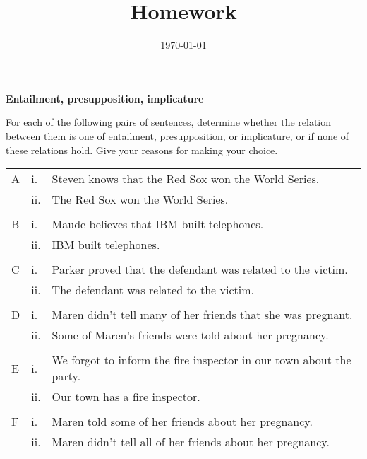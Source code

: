 \documentclass[11pt]{article}
\title{Homework \hwnumber} %
\author{\myname} %
\date{\textbf{\mycourse} \hfill {\today} \hfill \textbf{\semesteryear}} %
\begin{document}
\thispagestyle{empty} %

\clearpage %
\maketitle


\begin{problem}{1}
\textbf{Entailment, presupposition, implicature}

For each of the following pairs of sentences, determine whether the relation between them is one of entailment, presupposition, or implicature, or if none of these relations hold. Give your reasons for making your choice.

\begin{tabular}{l l l}
    A & i. & Steven knows that the Red Sox won the World Series. \\
    & ii. & The Red Sox won the World Series. \\
    & & \\
    B & i. & Maude believes that IBM built telephones. \\
    & ii. & IBM built telephones. \\
    & & \\
    C & i. & Parker proved that the defendant was related to the victim. \\
    & ii. & The defendant was related to the victim. \\
    & & \\
    D & i. & Maren didn’t tell many of her friends that she was pregnant. \\
    & ii. & Some of Maren's friends were told about her pregnancy. \\
    & & \\
    E & i. & We forgot to inform the fire inspector in our town about the party. \\
    & ii. & Our town has a fire inspector. \\
    & & \\
    F & i. & Maren told some of her friends about her pregnancy. \\
    & ii. & Maren didn't tell all of her friends about her pregnancy. \\
\end{tabular}

\end{problem}
\end{document}
